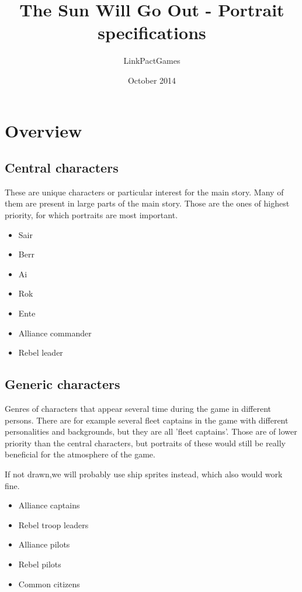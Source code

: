 \documentclass[a4paper,12pt]{article}
\begin{document}
\title{The Sun Will Go Out - Portrait specifications}
\author{LinkPactGames}
\date{October 2014}
\maketitle

\section{Overview}

\subsection{Central characters}

These are unique characters or particular interest for the main story. Many of them
are present in large parts of the main story. Those are the ones of highest priority,
for which portraits are most important.

\begin{itemize}
	\item{Sair}
	\item{Berr}
	\item{Ai}
	\item{Rok}
	\item{Ente}
	\item{Alliance commander}
	\item{Rebel leader}
\end{itemize}

\subsection{Generic characters}

Genres of characters that appear several time during the game in different persons.
There are for example several fleet captains in the game with different personalities and backgrounds,
but they are all 'fleet captains'. Those are of lower priority than the central characters, but portraits of these 
would still be really beneficial for the atmosphere of the game.

If not drawn,we will probably use ship sprites instead, which also would work fine.

\begin{itemize}
	\item{Alliance captains}
	\item{Rebel troop leaders}
	\item{Alliance pilots}
	\item{Rebel pilots}
	\item{Common citizens}
\end{itemize}
\end{document}
